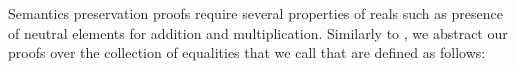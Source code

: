 Semantics preservation proofs require several properties of reals such
as presence of neutral elements for addition and multiplication.
Similarly to , we abstract our proofs over the collection
of equalities that we call  that are defined as follows:
\begin{code}[hide]%
\>[0]\AgdaSpace{}%
\AgdaSpace{}%
\<%
\\
\>[0][@{}l@{\AgdaIndent{0}}]%
\>[2]\AgdaSpace{}%
\AgdaSpace{}%
\AgdaSpace{}%
\AgdaSpace{}%
\AgdaSpace{}%
\AgdaSpace{}%
\AgdaSymbol{(}\AgdaSymbol{;}\AgdaSpace{}%
\AgdaSymbol{;}\AgdaSpace{}%
\AgdaSymbol{)}\<%
\\
%
\>[2]\AgdaSpace{}%
\AgdaSpace{}%
\<%
\\
%
\>[2]\AgdaSpace{}%
\<%
\\
%
\>[2]\AgdaSpace{}%
\<%
\end{code}
